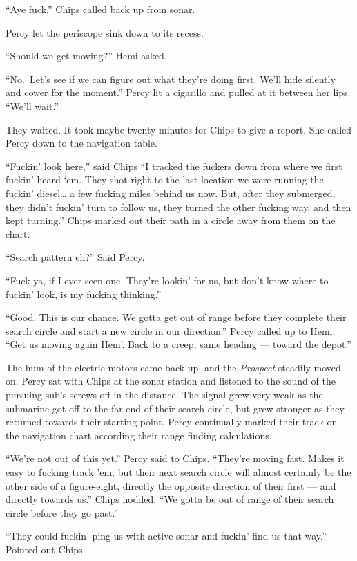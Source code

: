 \documentclass[]{scrbook}
\begin{document}
``Aye fuck.'' Chips called back up from sonar.

Percy let the periscope sink down to its recess.

``Should we get moving?'' Hemi asked.

``No.~Let's see if we can figure out what they're doing first. We'll
hide silently and cower for the moment.'' Percy lit a cigarillo and
pulled at it between her lips. ``We'll wait.''

They waited. It took maybe twenty minutes for Chips to give a report.
She called Percy down to the navigation table.

``Fuckin' look here,'' said Chips ``I tracked the fuckers down from
where we first fuckin' heard `em. They shot right to the last location
we were running the fuckin' diesel\ldots{} a few fucking miles behind us
now. But, after they submerged, they didn't fuckin' turn to follow us,
they turned the other fucking way, and then kept turning.'' Chips marked
out their path in a circle away from them on the chart.

``Search pattern eh?'' Said Percy.

``Fuck ya, if I ever seen one. They're lookin' for us, but don't know
where to fuckin' look, is my fucking thinking.''

``Good. This is our chance. We gotta get out of range before they
complete their search circle and start a new circle in our direction.''
Percy called up to Hemi. ``Get us moving again Hem'. Back to a creep,
same heading --- toward the depot.''

The hum of the electric motors came back up, and the \emph{Prospect}
steadily moved on. Percy sat with Chips at the sonar station and
listened to the sound of the pursuing sub's screws off in the distance.
The signal grew very weak as the submarine got off to the far end of
their search circle, but grew stronger as they returned towards their
starting point. Percy continually marked their track on the navigation
chart according their range finding calculations.

``We're not out of this yet.'' Percy said to Chips. ``They're moving
fast. Makes it easy to fucking track 'em, but their next search circle
will almost certainly be the other side of a figure-eight, directly the
opposite direction of their first --- and directly towards us.'' Chips
nodded. ``We gotta be out of range of their search circle before they go
past.''

``They could fuckin' ping us with active sonar and fuckin' find us that
way.'' Pointed out Chips.
\end{document}
